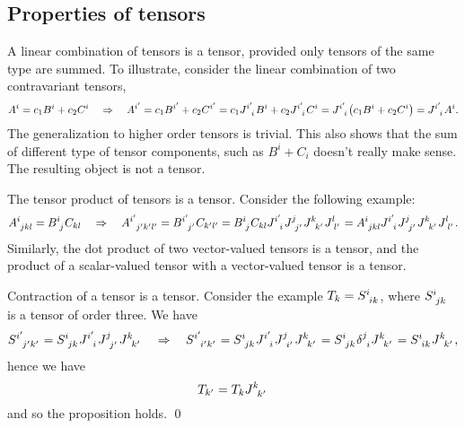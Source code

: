 \documentclass{article}
\begin{document}
	\subsection{Properties of tensors}
	\begin{proposition}
		A linear combination of tensors is a tensor, provided only tensors of the same type are summed. To illustrate, consider the linear combination of two contravariant tensors,
		\[
		A^{i} = c_{1} B^{i} + c_{2} C^{i} \implies A^{i^\prime} = c_1 B^{i^\prime} + c_2 C^{i^\prime} = c_1 J\indices{^{i^\prime}_{i}} B^{i} + c_2 J\indices{^{i^\prime}_{i}} C^{i} = J\indices{^{i^\prime}_{i}} \qty(c_1 B^{i} + c_2 C^{i}) = J\indices{^{i^\prime}_i} A^{i}.
		\]
		The generalization to higher order tensors is trivial. This also shows that the sum of different type of tensor components, such as $ B^{i} + C_{i} $ doesn't really make sense. The resulting object is not a tensor.
	\end{proposition}
	\begin{proposition}
		The tensor product of tensors is a tensor. Consider the following example:
		\[
		A\indices{^i_{j k l}}=B\indices{^i_{j}} C_{k l} \implies A\indices{^{i^\prime}_{j^{\prime} k^{\prime} l^{\prime}}}=B\indices{^{i^\prime}_{j^{\prime}}} C_{k^{\prime} l^{\prime}}=B\indices{^i_{j}} C_{k l} J\indices{^{i^\prime}_{i}} J\indices{^j_{j^{\prime}}} J\indices{^k_{k^{\prime}}} J\indices{^l_{l^{\prime}}}=A\indices{^i_{j k l}} J\indices{^{i^\prime}_{i}} J\indices{^j_{j^{\prime}}} J\indices{^k_{k^{\prime}}} J\indices{^l_{l^{\prime}}}.
		\]
		Similarly, the dot product of two vector-valued tensors is a tensor, and the product of a scalar-valued tensor with a vector-valued tensor is a tensor.
	\end{proposition}
	\begin{proposition}
		Contraction of a tensor is a tensor. Consider the example $ T_{k} = S\indices{^{i}_{ik}} $, where $ S\indices{^{i}_{jk}} $ is a tensor of order three. We have
		\[
		S\indices{^{i^{\prime}}_{j^{\prime} k^{\prime}}}=S\indices{^i_{j k} } J\indices{^{i^{\prime}}_i} J\indices{^j_{j^{\prime}}} J\indices{^k_{k^{\prime}} }
		\implies S\indices{^{i^{\prime}}_{i^{\prime} k^{\prime}}} 
		= S\indices{^i_{j k}}  J\indices{^{i^\prime}_{i}} J\indices{^j_{i^{\prime}}} J\indices{^k_{k^{\prime}} }
		= S\indices{^i_{j k}} \delta\indices{^j_{i}} J\indices{^k_{k^{\prime}}} 
		= S\indices{^i_{i k}} J\indices{^k_{k^{\prime}}},
		\]
		hence we have
		\[
		T_{k^{\prime}}=T_{k} J\indices{^k_{k^{\prime}}}
		\]
		and so the proposition holds. \qed
	\end{proposition}
\end{document}
